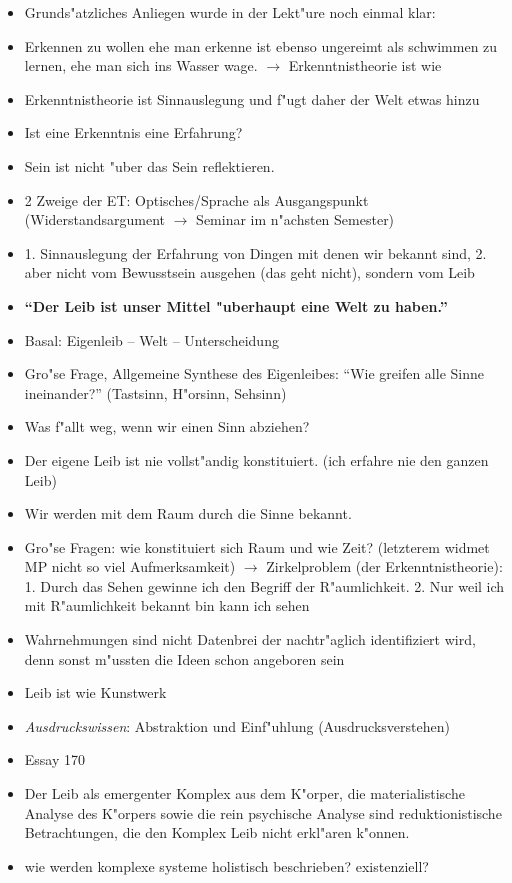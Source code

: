 \documentclass[emulatestandardclasses]{scrartcl}
\begin{document}
\begin{itemize}
  \item Grunds"atzliches Anliegen wurde in der Lekt"ure noch einmal klar: 
  \item Erkennen zu wollen ehe man erkenne ist ebenso ungereimt als schwimmen zu lernen, ehe man sich ins Wasser wage. $\rightarrow$ Erkenntnistheorie ist wie 
  \item Erkenntnistheorie ist Sinnauslegung und f"ugt daher der Welt etwas hinzu
  \item Ist eine Erkenntnis eine Erfahrung?
  \item Sein ist nicht "uber das Sein reflektieren.
  \item 2 Zweige der ET: Optisches/Sprache als Ausgangspunkt (Widerstandsargument $\rightarrow$ Seminar im n"achsten Semester)
  \item 1. Sinnauslegung der Erfahrung von Dingen mit denen wir bekannt sind, 2. aber nicht vom Bewusstsein ausgehen (das geht nicht), sondern vom Leib
  \item \textbf{"`Der Leib ist unser Mittel "uberhaupt eine Welt zu haben."'}
  \item Basal: Eigenleib -- Welt -- Unterscheidung
  \item Gro"se Frage, Allgemeine Synthese des Eigenleibes: "`Wie greifen alle Sinne ineinander?"' (Tastsinn, H"orsinn, Sehsinn)
  \item Was f"allt weg, wenn wir einen Sinn abziehen? 
  \item Der eigene Leib ist nie vollst"andig konstituiert. (ich erfahre nie den ganzen Leib)
  \item Wir werden mit dem Raum durch die Sinne bekannt.
  \item Gro"se Fragen: wie konstituiert sich Raum und wie Zeit? (letzterem widmet MP nicht so viel Aufmerksamkeit) $\rightarrow$ Zirkelproblem (der Erkenntnistheorie): 1. Durch das Sehen gewinne ich den Begriff der R"aumlichkeit. 2. Nur weil ich mit R"aumlichkeit bekannt bin kann ich sehen
  \item Wahrnehmungen sind nicht Datenbrei der nachtr"aglich identifiziert wird, denn sonst m"ussten die Ideen schon angeboren sein
  \item Leib ist wie Kunstwerk
  \item \emph{Ausdruckswissen}: Abstraktion und Einf"uhlung (Ausdrucksverstehen)
  \item Essay 170
\end{itemize}


\begin{itemize}
  \item Der Leib als emergenter Komplex aus dem K"orper, die materialistische Analyse des K"orpers sowie die rein psychische Analyse sind reduktionistische Betrachtungen, die den Komplex Leib nicht erkl"aren k"onnen.
  \item wie werden komplexe systeme  holistisch beschrieben? existenziell?
\end{itemize}
\end{document}
